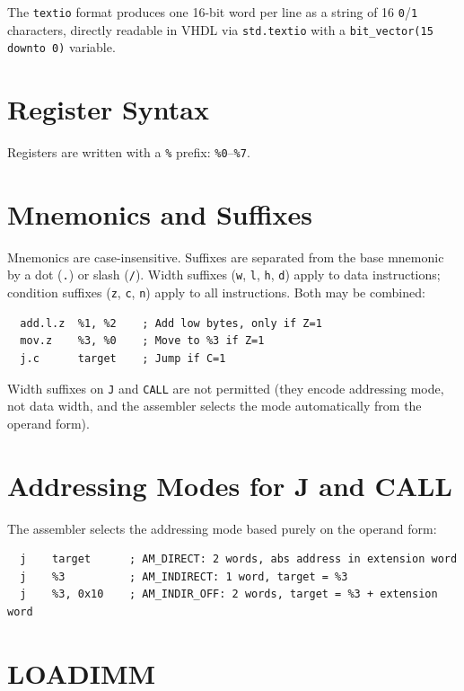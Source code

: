 \documentclass[a4paper,12pt]{report}
\newcommand{\asm}[1]{\texttt{#1}}
\newcommand{\reg}[1]{\texttt{\%#1}}
\begin{document}
The \texttt{textio} format produces one 16-bit word per line as a string of 16 \texttt{0}/\texttt{1} characters, directly readable in VHDL via \texttt{std.textio} with a \texttt{bit\_vector(15 downto 0)} variable.

\section{Register Syntax}

Registers are written with a \texttt{\%} prefix: \reg{0}--\reg{7}.

\section{Mnemonics and Suffixes}

Mnemonics are case-insensitive. Suffixes are separated from the base mnemonic by a dot (\texttt{.}) or slash (\texttt{/}). Width suffixes (\texttt{w}, \texttt{l}, \texttt{h}, \texttt{d}) apply to data instructions; condition suffixes (\texttt{z}, \texttt{c}, \texttt{n}) apply to all instructions. Both may be combined:

\begin{lstlisting}
  add.l.z  %1, %2    ; Add low bytes, only if Z=1
  mov.z    %3, %0    ; Move to %3 if Z=1
  j.c      target    ; Jump if C=1
\end{lstlisting}

Width suffixes on \asm{J} and \asm{CALL} are not permitted (they encode addressing mode, not data width, and the assembler selects the mode automatically from the operand form).

\section{Addressing Modes for J and CALL}

The assembler selects the addressing mode based purely on the operand form:

\begin{lstlisting}
  j    target      ; AM_DIRECT: 2 words, abs address in extension word
  j    %3          ; AM_INDIRECT: 1 word, target = %3
  j    %3, 0x10    ; AM_INDIR_OFF: 2 words, target = %3 + extension word
\end{lstlisting}

\section{LOADIMM}
\end{document}
